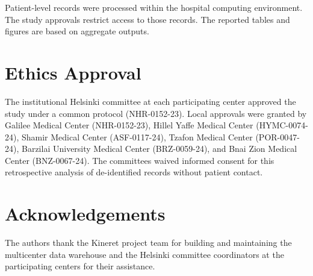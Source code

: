 \documentclass[preprint,12pt]{elsarticle}
\begin{document}
Patient-level records were processed within the hospital computing environment. The study approvals restrict access to those records. The reported tables and figures are based on aggregate outputs.

\section*{Ethics Approval}
The institutional Helsinki committee at each participating center approved the study under a common protocol (NHR-0152-23). Local approvals were granted by Galilee Medical
Center (NHR-0152-23), Hillel Yaffe Medical Center (HYMC-0074-24), Shamir
Medical Center (ASF-0117-24), Tzafon Medical Center (POR-0047-24), Barzilai
University Medical Center (BRZ-0059-24), and Bnai Zion Medical Center
(BNZ-0067-24). The committees waived informed consent for this retrospective analysis of de-identified records without patient contact.

\section*{Acknowledgements}
The authors thank the Kineret project team for building and maintaining the multicenter data warehouse and the Helsinki committee coordinators at the participating centers for their assistance.



\end{document}
